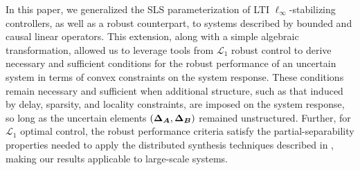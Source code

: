 In this paper, we generalized the SLS parameterization of LTI $\ell_\infty$-stabilizing controllers, as well as a robust counterpart, to systems described by bounded and causal linear operators.  This extension, along with a simple algebraic transformation, allowed us to leverage tools from $\mathcal{L}_1$ robust control to derive necessary and sufficient conditions for the robust performance of an uncertain system in terms of convex constraints on the system response.  These conditions remain necessary and sufficient when additional structure, such as that induced by delay, sparsity, and locality constraints, are imposed on the system response, so long as the uncertain elements $({\boldsymbol{\Delta}}_{\boldsymbol{A}},{\boldsymbol{\Delta}}_{\boldsymbol{B}})$ remained unstructured.  Further, for $\mathcal{L}_1$ optimal control, the robust performance criteria satisfy the partial-separability properties needed to apply the distributed synthesis techniques described in \cite{wang2018separable}, making our results applicable to large-scale systems. 

